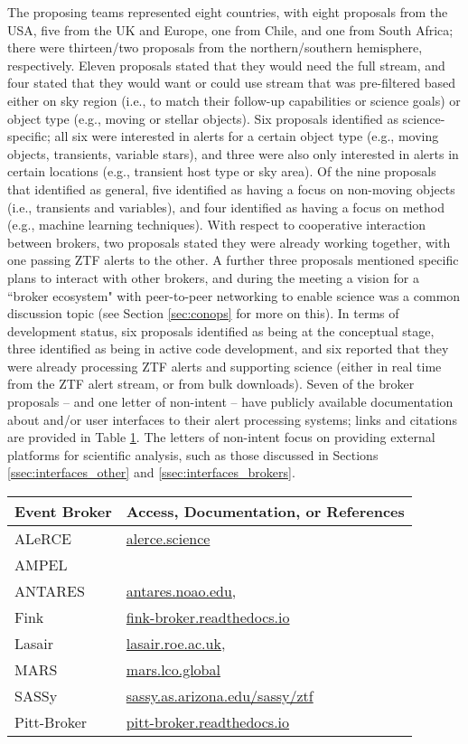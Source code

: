 The proposing teams represented eight countries, with eight proposals from the USA, five from the UK and Europe, one from Chile, and one from South Africa; there were thirteen/two proposals from the northern/southern hemisphere, respectively.
Eleven proposals stated that they would need the full stream, and four stated that they would want or could use stream that was pre-filtered based either on sky region (i.e., to match their follow-up capabilities or science goals) or object type (e.g., moving or stellar objects).
Six proposals identified as science-specific; all six were interested in alerts for a certain object type (e.g., moving objects, transients, variable stars), and three were also only interested in alerts in certain locations (e.g., transient host type or sky area).
Of the nine proposals that identified as general, five identified as having a focus on non-moving objects (i.e., transients and variables), and four identified as having a focus on method (e.g., machine learning techniques).
With respect to cooperative interaction between brokers, two proposals stated they were already working together, with one passing ZTF alerts to the other.
A further three proposals mentioned specific plans to interact with other brokers, and during the meeting a vision for a ``broker ecosystem" with peer-to-peer networking to enable science was a common discussion topic (see Section \ref{sec:conops} for more on this).
In terms of development status, six proposals identified as being at the conceptual stage, three identified as being in active code development, and six reported that they were already processing ZTF alerts and supporting science (either in real time from the ZTF alert stream, or from bulk downloads). 
Seven of the broker proposals -- and one letter of non-intent -- have publicly available documentation about and/or user interfaces to their alert processing systems; links and citations are provided in Table \ref{tab:brokers}.
The letters of non-intent focus on providing external platforms for scientific analysis, such as those discussed in Sections \ref{ssec:interfaces_other} and \ref{ssec:interfaces_brokers}.

\begin{table}[h!]
\label{tab:brokers}
\centering
 \begin{tabular}{ll} 
 \hline
 Event Broker & Access, Documentation, or References \\
 \hline\hline
 ALeRCE & \url{alerce.science} \\
 AMPEL & \protect{\citet{ampel}} \\
 ANTARES & \url{antares.noao.edu},\ \protect{\citet{2016SPIE.9910E..0FS}}\\
 Fink & \url{fink-broker.readthedocs.io} \\
 Lasair & \url{lasair.roe.ac.uk},\ \protect{\citet{2019RNAAS...3...26S}} \\
 MARS & \url{mars.lco.global} \\
 SASSy & \url{sassy.as.arizona.edu/sassy/ztf} \\
 Pitt-Broker & \url{pitt-broker.readthedocs.io} \\
 \hline
 \end{tabular}
\end{table}

